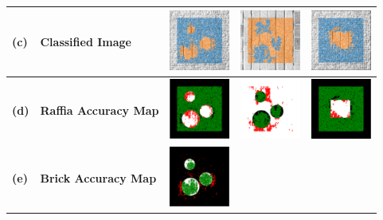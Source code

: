 \begin{minipage}{\linewidth}
\begin{center}
\begin{tabular}{>{\bfseries\centering}m{0.2in} >{\centering\bfseries}m{1in} >{\centering}m{1in} >{\centering}m{1in} >{\centering\arraybackslash}m{1in}}
			\\
			\hline
			(c)
			&
			Classified Image
			&
			\includegraphics[width=75px, frame]{figures/accuracy_maps/brick_gravel_01_overlay_tight.png}
			&
			\includegraphics[width=75px, frame]{figures/accuracy_maps/brick_gravel_02_overlay_tight.png}
			&
			\includegraphics[width=75px, frame]{figures/accuracy_maps/brick_gravel_03_overlay_tight.png}
			\\
			\hline
			(d)
			&
			Raffia Accuracy Map
			&
			\includegraphics[width=75px, frame]{figures/accuracy_maps/brick_gravel_01_gravel_92_5.pdf}
			&
			\includegraphics[width=75px, frame]{figures/accuracy_maps/brick_gravel_02_gravel.pdf}
			&
			\includegraphics[width=75px, frame]{figures/accuracy_maps/brick_gravel_03_gravel.pdf}
			\\
			\hline
			(e)
			&
			Brick Accuracy Map
			&
			\includegraphics[width=75px, frame]{figures/accuracy_maps/brick_gravel_01_brick_84_6.pdf}

\end{tabular}
\end{center}
\end{minipage}
